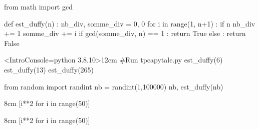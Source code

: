 \documentclass[french,a4paper,10pt]{article}
\begin{document}
\begin{python}
from math import gcd

def est_duffy(n) :
	nb_div, somme_div = 0, 0
	for i in range(1, n+1) :
		if n %
			nb_div += 1
			somme_div += i
	if gcd(somme_div, n) == 1 :
		return True
	else :
		return False
	
\end{python}
\begin{PitonThonnyConsole}<IntroConsole={python 3.8.10}>{12cm}
#Run tpcapytale.py
est_duffy(6)
est_duffy(13)
est_duffy(265)

from random import randint
nb = randint(1,100000)
nb, est_duffy(nb)
\end{PitonThonnyConsole}

{\small\begin{codehigh}
\begin{PitonThonnyConsole}{8cm}
[i**2 for i in range(50)]
\end{PitonThonnyConsole}
\end{codehigh}}

\begin{PitonThonnyConsole}{8cm}
[i**2 for i in range(50)]
\end{PitonThonnyConsole}
\end{document}
